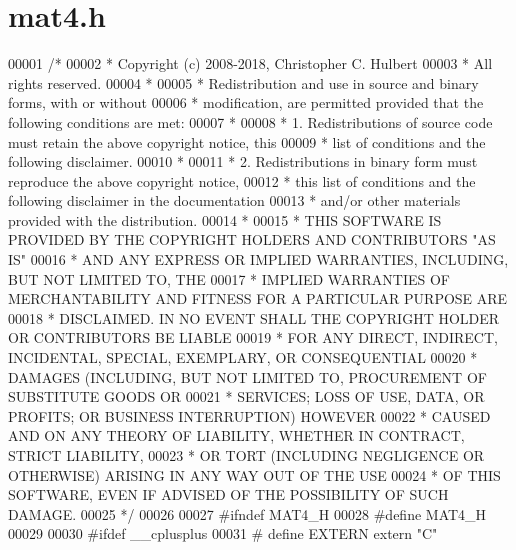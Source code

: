 \hypertarget{mat4_8h_source}{}\section{mat4.\+h}
\label{mat4_8h_source}

\begin{DoxyCode}
00001 \textcolor{comment}{/*}
00002 \textcolor{comment}{ * Copyright (c) 2008-2018, Christopher C. Hulbert}
00003 \textcolor{comment}{ * All rights reserved.}
00004 \textcolor{comment}{ *}
00005 \textcolor{comment}{ * Redistribution and use in source and binary forms, with or without}
00006 \textcolor{comment}{ * modification, are permitted provided that the following conditions are met:}
00007 \textcolor{comment}{ *}
00008 \textcolor{comment}{ * 1. Redistributions of source code must retain the above copyright notice, this}
00009 \textcolor{comment}{ *    list of conditions and the following disclaimer.}
00010 \textcolor{comment}{ *}
00011 \textcolor{comment}{ * 2. Redistributions in binary form must reproduce the above copyright notice,}
00012 \textcolor{comment}{ *    this list of conditions and the following disclaimer in the documentation}
00013 \textcolor{comment}{ *    and/or other materials provided with the distribution.}
00014 \textcolor{comment}{ *}
00015 \textcolor{comment}{ * THIS SOFTWARE IS PROVIDED BY THE COPYRIGHT HOLDERS AND CONTRIBUTORS "AS IS"}
00016 \textcolor{comment}{ * AND ANY EXPRESS OR IMPLIED WARRANTIES, INCLUDING, BUT NOT LIMITED TO, THE}
00017 \textcolor{comment}{ * IMPLIED WARRANTIES OF MERCHANTABILITY AND FITNESS FOR A PARTICULAR PURPOSE ARE}
00018 \textcolor{comment}{ * DISCLAIMED. IN NO EVENT SHALL THE COPYRIGHT HOLDER OR CONTRIBUTORS BE LIABLE}
00019 \textcolor{comment}{ * FOR ANY DIRECT, INDIRECT, INCIDENTAL, SPECIAL, EXEMPLARY, OR CONSEQUENTIAL}
00020 \textcolor{comment}{ * DAMAGES (INCLUDING, BUT NOT LIMITED TO, PROCUREMENT OF SUBSTITUTE GOODS OR}
00021 \textcolor{comment}{ * SERVICES; LOSS OF USE, DATA, OR PROFITS; OR BUSINESS INTERRUPTION) HOWEVER}
00022 \textcolor{comment}{ * CAUSED AND ON ANY THEORY OF LIABILITY, WHETHER IN CONTRACT, STRICT LIABILITY,}
00023 \textcolor{comment}{ * OR TORT (INCLUDING NEGLIGENCE OR OTHERWISE) ARISING IN ANY WAY OUT OF THE USE}
00024 \textcolor{comment}{ * OF THIS SOFTWARE, EVEN IF ADVISED OF THE POSSIBILITY OF SUCH DAMAGE.}
00025 \textcolor{comment}{ */}
00026 
00027 \textcolor{preprocessor}{#ifndef MAT4\_H}
00028 \textcolor{preprocessor}{#define MAT4\_H}
00029 
00030 \textcolor{preprocessor}{#ifdef \_\_cplusplus}
00031 \textcolor{preprocessor}{#   define EXTERN extern "C"}

\end{DoxyCode}

